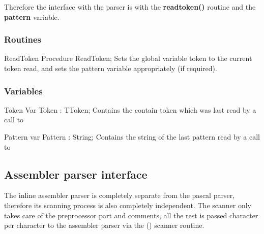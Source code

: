 \documentclass [a4paper,12pt]{article}
\begin{document}
Therefore the interface with the parser is with the \textbf{readtoken()}
routine and the \textbf{pattern} variable.

\subsubsection{Routines}
\label{subsubsec:routinese}

\begin{procedure}{ReadToken}
\Declaration
Procedure ReadToken;
\Description
Sets the global variable \textsf{token} to the current token read, and sets
the \textsf{pattern} variable appropriately (if required).
\end{procedure}


\subsubsection{Variables}
\label{subsubsec:variablesglobal}

\begin{variable}{Token}
\Description
Var Token : TToken;
\Description
Contains the contain token which was last read by a call to 
\SeeAlso
\end{variable}


\begin{variable}{Pattern}
\Declaration
var Pattern : String;
\Description
Contains the string of the last pattern read by a call to
\SeeAlso
\end{variable}


\subsection{Assembler parser interface}
\label{subsec:assembler}

The inline assembler parser is completely separate from the pascal parser,
therefore its scanning process is also completely independent. The scanner
only takes care of the preprocessor part and comments, all the rest is
passed character per character to the assembler parser via the
() scanner routine.
\end{document}
